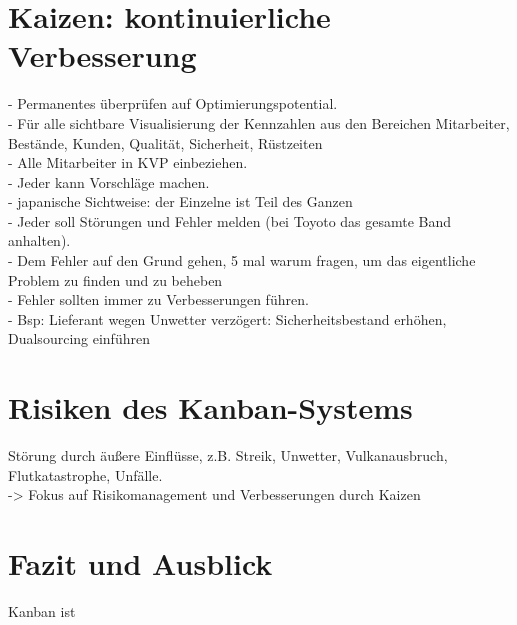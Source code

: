 \section{Kaizen: kontinuierliche Verbesserung}
- Permanentes überprüfen auf Optimierungspotential.\\
- Für alle sichtbare Visualisierung der Kennzahlen aus den Bereichen Mitarbeiter, Bestände, Kunden, Qualität, Sicherheit, Rüstzeiten\\
- Alle Mitarbeiter in KVP einbeziehen.\\
- Jeder kann Vorschläge machen.\\
- japanische Sichtweise: der Einzelne ist Teil des Ganzen\\
- Jeder soll Störungen und Fehler melden (bei Toyoto das gesamte Band anhalten).\\
- Dem Fehler auf den Grund gehen, 5 mal warum fragen, um das eigentliche Problem zu finden und zu beheben\\
- Fehler sollten immer zu Verbesserungen führen.\\
- Bsp: Lieferant wegen Unwetter verzögert: Sicherheitsbestand erhöhen, Dualsourcing einführen\\

\section{Risiken des Kanban-Systems}
Störung durch äußere Einflüsse, z.B. Streik, Unwetter, Vulkanausbruch, Flutkatastrophe, Unfälle.\\
-> Fokus auf Risikomanagement und Verbesserungen durch Kaizen\\

\section{Fazit und Ausblick}
Kanban ist 
